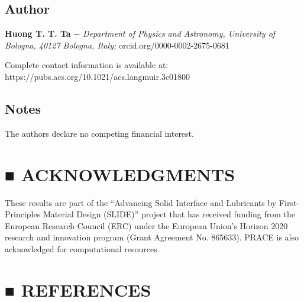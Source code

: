 \documentclass{article}
\begin{document}
\subsection*{Author}

\noindent\textbf{Huong T. T. Ta} − \textit{Department of Physics and Astronomy, University of Bologna, 40127 Bologna, Italy;} orcid.org/0000-0002-2675-0681

\noindent Complete contact information is available at: https://pubs.acs.org/10.1021/acs.langmuir.3c01800

\subsection*{Notes}

The authors declare no competing financial interest.

\section*{■ ACKNOWLEDGMENTS}

These results are part of the “Advancing Solid Interface and Lubricants by First-Principles Material Design (SLIDE)” project that has received funding from the European Research Council (ERC) under the European Union’s Horizon 2020 research and innovation program (Grant Agreement No. 865633). PRACE is also acknowledged for computational resources.

\section*{■ REFERENCES}
\end{document}
